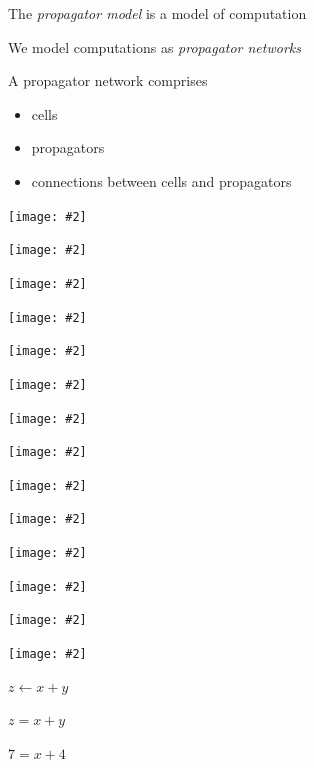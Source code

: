 \documentclass[usenames,dvipsnames,svgnames,table,aspectratio=1610,mathserif]{beamer}
\newcommand{\nl}{\vspace{\baselineskip}}
\newcommand{\imageslide}[2][1]{{
\begin{frame}\begin{center}
\texttt{[image: \#2]}
\end{center}\end{frame}
}}
\begin{document}
\begin{frame}
The {\it propagator model} is a model of computation

\nl

We model computations as {\it propagator networks}
\end{frame}


\begin{frame}

A propagator network comprises
\begin{itemize}
\item cells
\item propagators
\item connections between cells and propagators
\end{itemize}

\end{frame}


\imageslide{diagrams/cell1.pdf}
\imageslide{diagrams/cell2.pdf}
\imageslide{diagrams/prop.pdf}

\imageslide{diagrams/always1.pdf}
\imageslide{diagrams/always2.pdf}
\imageslide{diagrams/always3.pdf}
\imageslide{diagrams/always4.pdf}

\imageslide{diagrams/upper1.pdf}
\imageslide{diagrams/upper2.pdf}
\imageslide{diagrams/upper3.pdf}

\imageslide{diagrams/add1.pdf}
\imageslide{diagrams/add2.pdf}
\imageslide{diagrams/add3.pdf}
\imageslide{diagrams/add4.pdf}




\begin{frame}
  \begin{center}
    \begin{LARGE}
      $z \leftarrow x + y$
    \end{LARGE}
  \end{center}
\end{frame}


\begin{frame}
  \begin{center}
    \begin{LARGE}
      $z = x + y$
    \end{LARGE}
  \end{center}
\end{frame}


\begin{frame}
  \begin{center}
    \begin{LARGE}
      $7 = x + 4$
    \end{LARGE}
  \end{center}
\end{frame}
\end{document}
